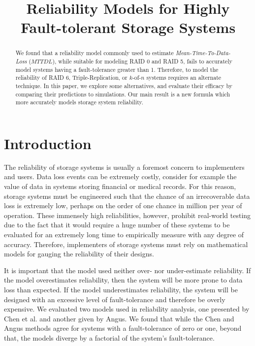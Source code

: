 \documentclass[XXX,endnotes]{usetex-v1}
\begin{document}
\title{Reliability Models for Highly Fault-tolerant Storage Systems}


\author{
\and
{}
} 
\maketitle

\begin{abstract}

We found that a reliability model commonly used to estimate \emph{Mean-Time-To-Data-Loss} ($MTTDL$), while suitable for modeling RAID 0 and RAID 5, fails to accurately model systems having a fault-tolerance greater than 1.  Therefore, to model the reliability of RAID 6, Triple-Replication, or $k$-of-$n$ systems requires an alternate technique.  In this paper, we explore some alternatives, and evaluate their efficacy by comparing their predictions to simulations.  Our main result is a new formula which more accurately models storage system reliability.

\end{abstract}

\section{Introduction}

The reliability of storage systems is usually a foremost concern to implementers and users.  Data loss events can be extremely costly, consider for example the value of data in systems storing financial or medical records.  For this reason, storage systems must be engineered such that the chance of an irrecoverable data loss is extremely low, perhaps on the order of one chance in million per year of operation.  These immensely high reliabilities, however, prohibit real-world testing due to the fact that it would require a huge number of these systems to be evaluated for an extremely long time to empirically measure with any degree of accuracy.  Therefore, implementers of storage systems must rely on mathematical models for gauging the reliability of their designs.

It is important that the model used neither over- nor under-estimate reliability.  If the model overestimates reliability, then the system will be more prone to data loss than expected.  If the model underestimates reliability, the system will be designed with an excessive level of fault-tolerance and therefore be overly expensive.  We evaluated two models used in reliability analysis, one presented by Chen et al.\cite{reliability} and another given by Angus\cite{markov}. We found that while the Chen and Angus methods agree for systems with a fault-tolerance of zero or one, beyond that, the models diverge by a factorial of the system's fault-tolerance.
\end{document}
